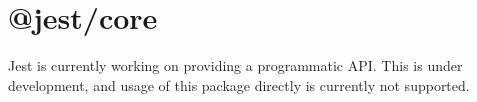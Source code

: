\chapter{@jest/core}
\hypertarget{md_pkiclassroomrescheduler_2src_2main_2frontend_2node__modules_2_0djest_2core_2_r_e_a_d_m_e}{}\label{md_pkiclassroomrescheduler_2src_2main_2frontend_2node__modules_2_0djest_2core_2_r_e_a_d_m_e}
\label{md_pkiclassroomrescheduler_2src_2main_2frontend_2node__modules_2_0djest_2core_2_r_e_a_d_m_e_autotoc_md1461}%
%
 Jest is currently working on providing a programmatic API. This is under development, and usage of this package directly is currently not supported. 